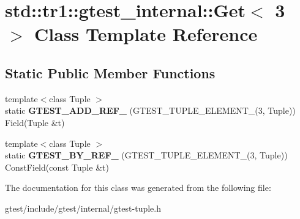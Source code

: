 \hypertarget{classstd_1_1tr1_1_1gtest__internal_1_1Get_3_013_01_4}{}\section{std\+:\+:tr1\+:\+:gtest\+\_\+internal\+:\+:Get$<$ 3 $>$ Class Template Reference}
\label{classstd_1_1tr1_1_1gtest__internal_1_1Get_3_013_01_4}
\subsection*{Static Public Member Functions}
\begin{DoxyCompactItemize}
\item 
\mbox{\label{classstd_1_1tr1_1_1gtest__internal_1_1Get_3_013_01_4_aa2ebd71eca812f06bad0773a7e2f6788}} 
{\footnotesize template$<$class Tuple $>$ }\\static {\bfseries G\+T\+E\+S\+T\+\_\+\+A\+D\+D\+\_\+\+R\+E\+F\+\_\+} (G\+T\+E\+S\+T\+\_\+\+T\+U\+P\+L\+E\+\_\+\+E\+L\+E\+M\+E\+N\+T\+\_\+(3, Tuple)) Field(Tuple \&t)
\item 
\mbox{\label{classstd_1_1tr1_1_1gtest__internal_1_1Get_3_013_01_4_ab8c5283e6776308abc41aaad518a23c7}} 
{\footnotesize template$<$class Tuple $>$ }\\static {\bfseries G\+T\+E\+S\+T\+\_\+\+B\+Y\+\_\+\+R\+E\+F\+\_\+} (G\+T\+E\+S\+T\+\_\+\+T\+U\+P\+L\+E\+\_\+\+E\+L\+E\+M\+E\+N\+T\+\_\+(3, Tuple)) Const\+Field(const Tuple \&t)
\end{DoxyCompactItemize}


The documentation for this class was generated from the following file\+:\begin{DoxyCompactItemize}
\item 
gtest/include/gtest/internal/gtest-\/tuple.\+h\end{DoxyCompactItemize}
